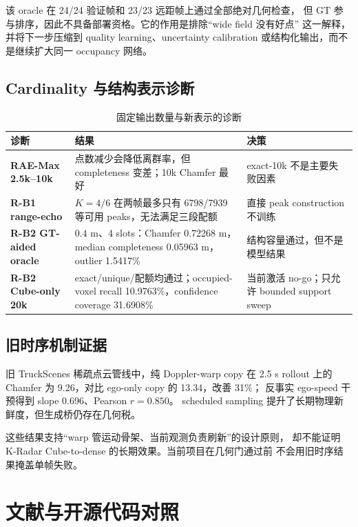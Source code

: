 \documentclass[11pt,a4paper,fontset=none]{ctexart}
\begin{document}
该 oracle 在 24/24 验证帧和 23/23 远距帧上通过全部绝对几何检查，
但 GT 参与排序，因此不具备部署资格。它的作用是排除“wide field 没有好点”
这一解释，并将下一步压缩到 quality learning、uncertainty calibration
或结构化输出，而不是继续扩大同一 occupancy 网络。

\subsection{Cardinality 与结构表示诊断}

\begin{table}[H]
\centering
\small
\caption{固定输出数量与新表示的诊断}
\begin{tabularx}{\textwidth}{>{\bfseries}p{2.6cm} Y Y}
\toprule
诊断 & 结果 & 决策 \\
\midrule
RAE-Max 2.5k--10k & 点数减少会降低离群率，但 completeness 变差；10k Chamfer 最好 & exact-10k 不是主要失败因素 \\
R-B1 range-echo & $K=4/6$ 在两帧最多只有 6798/7939 等可用 peaks，无法满足三段配额 & 直接 peak construction 不训练 \\
R-B2 GT-aided oracle & $0.4$ m、4 slots：Chamfer 0.72268 m，median completeness 0.05963 m，outlier 1.5417\% & 结构容量通过，但不是模型结果 \\
R-B2 Cube-only 20k & exact/unique/配额均通过；occupied-voxel recall 10.9763\%，confidence coverage 31.6908\% & 当前激活 no-go；只允许 bounded support sweep \\
\bottomrule
\end{tabularx}
\end{table}

\subsection{旧时序机制证据}

旧 TruckScenes 稀疏点云管线中，纯 Doppler-warp copy 在 2.5 s rollout
上的 Chamfer 为 9.26，对比 ego-only copy 的 13.34，改善 31\%；
反事实 ego-speed 干预得到 slope 0.696、Pearson $r=0.850$。
scheduled sampling 提升了长期物理新鲜度，但生成桥仍存在几何税。

这些结果支持“warp 管运动骨架、当前观测负责刷新”的设计原则，
却不能证明 K-Radar Cube-to-dense 的长期效果。当前项目在几何门通过前
不会用旧时序结果掩盖单帧失败。

\section{文献与开源代码对照}
\end{document}
